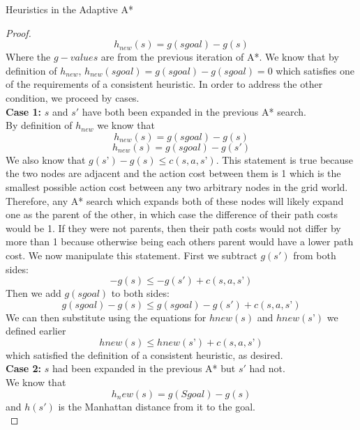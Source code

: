 \documentclass[12pt]{article}
\theoremstyle{definition}
\begin{document}
\begin{onehalfspacing}
\begin{section}{Heuristics in the Adaptive A*}
\begin{proof}
\begin{equation*}
    h_{new}(s) = g(sgoal) - g(s)
\end{equation*}
Where the $g-values$ are from the previous iteration of A*. We know that by definition of $h_{new}$, $h_{new}(sgoal) = g(sgoal) - g(sgoal) = 0$ which satisfies one of the requirements of a consistent heuristic. In order to address the other condition, we proceed by cases. \\[0.5em]
\textbf{Case 1:} $s$ and $s'$ have both been expanded in the previous A* search. \\
By definition of $h_{new}$ we know that
\begin{equation*}
    h_{new}(s) = g(sgoal) - g(s)
\end{equation*}
\begin{equation*}
    h_{new}(s) = g(sgoal) - g(s')
\end{equation*}
We also know that $g(s’) - g(s) \leq c(s, a, s’)$. This statement is true because the two nodes are adjacent and the action cost between them is 1 which is the smallest possible action cost between any two arbitrary nodes in the grid world. Therefore, any A* search which expands both of these nodes will likely expand one as the parent of the other, in which case the difference of their path costs would be 1. If they were not parents, then their path costs would not differ by more than 1 because otherwise being each others parent would have a lower path cost. We now manipulate this statement. First we subtract $g(s')$ from both sides:
\begin{equation*}
    -g(s) \leq -g(s') + c(s, a, s’)
\end{equation*}
Then we add $g(sgoal)$ to both sides:
\begin{equation*}
    g(sgoal)-g(s) \leq g(sgoal)-g(s') + c(s, a, s’)
\end{equation*}
We can then substitute using the equations for $hnew(s)$ and $hnew(s’)$ we defined earlier
\begin{equation*}
    hnew(s) \leq hnew(s’) + c(s, a, s’)
\end{equation*}
which satisfied the definition of a consistent heuristic, as desired. \\[0.5em]
\textbf{Case 2:} $s$ had been expanded in the previous A* but $s'$ had not.\\
We know that 
\begin{equation*}
    h_new(s) = g(Sgoal) - g(s)
\end{equation*}
and $h(s')$ is the Manhattan distance from it to the goal. \\

\end{proof}
\end{section}
\end{onehalfspacing}
\end{document}
